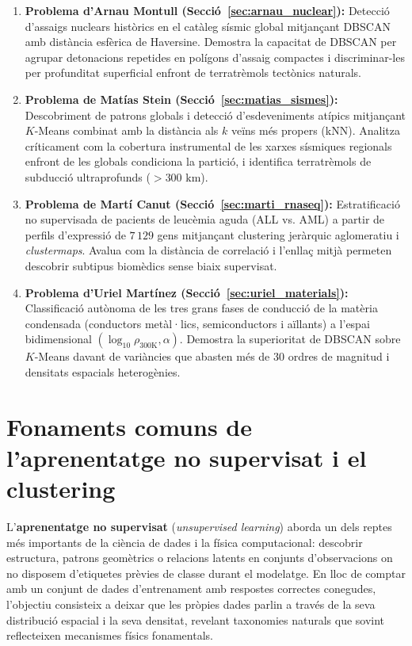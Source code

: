 \documentclass[a4paper,11pt]{article}
\begin{document}
\begin{enumerate}
    \item \textbf{Problema d'Arnau Montull (Secció~\ref{sec:arnau_nuclear}):} Detecció d'assaigs nuclears històrics en el catàleg sísmic global mitjançant DBSCAN amb distància esfèrica de Haversine. Demostra la capacitat de DBSCAN per agrupar detonacions repetides en polígons d'assaig compactes i discriminar-les per profunditat superficial enfront de terratrèmols tectònics naturals.

    \item \textbf{Problema de Matías Stein (Secció~\ref{sec:matias_sismes}):} Descobriment de patrons globals i detecció d'esdeveniments atípics mitjançant $K$-Means combinat amb la distància als $k$ veïns més propers (kNN). Analitza críticament com la cobertura instrumental de les xarxes sísmiques regionals enfront de les globals condiciona la partició, i identifica terratrèmols de subducció ultraprofunds ($>300\text{ km}$).

    \item \textbf{Problema de Martí Canut (Secció~\ref{sec:marti_rnaseq}):} Estratificació no supervisada de pacients de leucèmia aguda (ALL vs. AML) a partir de perfils d'expressió de $7\,129$ gens mitjançant clustering jeràrquic aglomeratiu i \emph{clustermaps}. Avalua com la distància de correlació i l'enllaç mitjà permeten descobrir subtipus biomèdics sense biaix supervisat.

    \item \textbf{Problema d'Uriel Martínez (Secció~\ref{sec:uriel_materials}):} Classificació autònoma de les tres grans fases de conducció de la matèria condensada (conductors metàl·lics, semiconductors i aïllants) a l'espai bidimensional $(\log_{10}\rho_{300\mathrm{K}}, \alpha)$. Demostra la superioritat de DBSCAN sobre $K$-Means davant de variàncies que abasten més de 30 ordres de magnitud i densitats espacials heterogènies.
\end{enumerate}


\clearpage
\section{Fonaments comuns de l'aprenentatge no supervisat i el clustering}
\label{sec:fonaments_comuns}

L'\textbf{aprenentatge no supervisat} (\emph{unsupervised learning}) aborda un dels reptes més importants de la ciència de dades i la física computacional: descobrir estructura, patrons geomètrics o relacions latents en conjunts d'observacions on no disposem d'etiquetes prèvies de classe durant el modelatge. En lloc de comptar amb un conjunt de dades d'entrenament amb respostes correctes conegudes, l'objectiu consisteix a deixar que les pròpies dades parlin a través de la seva distribució espacial i la seva densitat, revelant taxonomies naturals que sovint reflecteixen mecanismes físics fonamentals.
\end{document}
